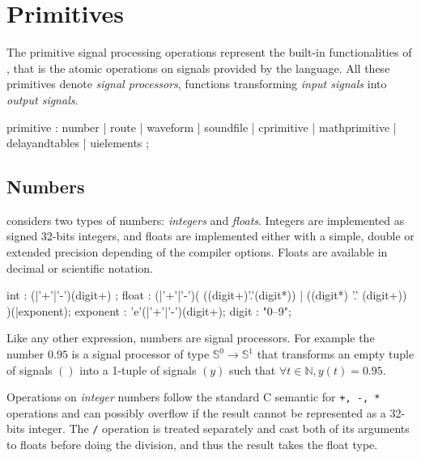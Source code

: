 \section{Primitives}
\label{primitives}
The primitive signal processing operations represent the built-in functionalities of \faust, that is the atomic operations on signals provided by the language. All these primitives denote \emph{signal processors}, functions transforming \emph{input signals} into \emph{output signals}.

  \begin{rail}
  primitive : number
  			| route
  			| waveform
			| soundfile
			| cprimitive
			| mathprimitive
			| delayandtables
			| uielements
			;
  \end{rail}

\subsection{Numbers}

\faust considers two types of numbers: \textit{integers} and \textit{floats}. Integers are implemented as signed 32-bits integers, and floats are implemented either with a simple, double or extended precision depending of the compiler options. Floats are available in decimal or scientific notation. 

  \begin{rail}
  int : (|'+'|'-')(digit+) ;
  float : (|'+'|'-')( ((digit+)'.'(digit*)) | ((digit*) '.' (digit+)) )(|exponent);
  exponent : 'e'(|'+'|'-')(digit+);
  digit : "0--9";
  \end{rail}

\bigskip

Like any other \faust expression, numbers are signal processors. For example the number $0.95$ is a signal processor of type $\mathbb{S}^{0}\rightarrow\mathbb{S}^{1}$ that transforms an empty tuple of signals $()$ into a 1-tuple of signals $(y)$ such that $\forall t\in\mathbb{N}, y(t)=0.95$.

Operations on \textit{integer} numbers follow the standard C semantic for \lstinline'+, -, *' operations and can possibly overflow if the result cannot be represented as a  32-bits integer. The \lstinline'/' operation is treated separately and cast both of its arguments to floats before doing the division, and thus the result takes the float type.

